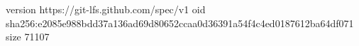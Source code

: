 version https://git-lfs.github.com/spec/v1
oid sha256:e2085e988bdd37a136ad69d80652ccaa0d36391a54f4c4ed0187612ba64df071
size 71107
